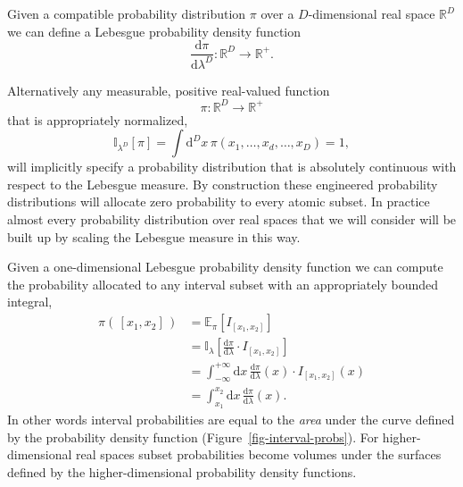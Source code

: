 \documentclass[
  letterpaper,
  DIV=11,
  numbers=noendperiod]{scrartcl}
\begin{document}
Given a compatible probability distribution \(\pi\) over a
\(D\)-dimensional real space \(\mathbb{R}^{D}\) we can define a Lebesgue
probability density function \[
\frac{ \mathrm{d} \pi }{ \mathrm{d} \lambda^{D} } :
\mathbb{R}^{D} \rightarrow \mathbb{R}^{+}.
\]

Alternatively any measurable, positive real-valued function \[
\pi : \mathbb{R}^{D} \rightarrow \mathbb{R}^{+}
\] that is appropriately normalized, \[
\mathbb{I}_{\lambda^{D}}[ \pi ]
= \int \mathrm{d}^{D} x \, \pi(x_{1}, \ldots, x_{d}, \ldots, x_{D})
= 1,
\] will implicitly specify a probability distribution that is absolutely
continuous with respect to the Lebesgue measure. By construction these
engineered probability distributions will allocate zero probability to
every atomic subset. In practice almost every probability distribution
over real spaces that we will consider will be built up by scaling the
Lebesgue measure in this way.

Given a one-dimensional Lebesgue probability density function we can
compute the probability allocated to any interval subset with an
appropriately bounded integral, \begin{align*}
\pi( \, [ x_{1}, x_{2} ] \, )
&=
\mathbb{E}_{\pi} \left[ I_{[ x_{1}, x_{2} ]} \right]
\\
&=
\mathbb{I}_{\lambda} \left[
\frac{ \mathrm{d} \pi }{ \mathrm{d} \lambda} \cdot I_{[ x_{1}, x_{2} ]}
\right]
\\
&=
\int_{-\infty}^{+\infty} \mathrm{d} x \,
\frac{ \mathrm{d} \pi }{ \mathrm{d} \lambda}(x) \cdot I_{[ x_{1}, x_{2} ]}(x)
\\
&=
\int_{x_{1}}^{x_{2}} \mathrm{d} x \,
\frac{ \mathrm{d} \pi }{ \mathrm{d} \lambda}(x).
\end{align*} In other words interval probabilities are equal to the
\emph{area} under the curve defined by the probability density function
(Figure~\ref{fig-interval-probs}). For higher-dimensional real spaces
subset probabilities become volumes under the surfaces defined by the
higher-dimensional probability density functions.
\end{document}
